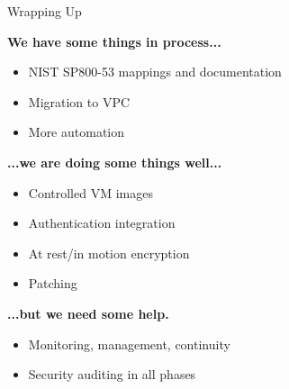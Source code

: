 \documentclass[t,handout]{beamer}   %
\begin{document}
\begin{frame}{Wrapping Up}

\textbf{We have some things in process...}
{\small
\begin{itemize}
\item NIST SP800-53 mappings and documentation
\item Migration to VPC
\item More automation
\end{itemize}
}

\textbf{...we are doing some things well...}
{\small
\begin{itemize}
\item Controlled VM images
\item Authentication integration
\item At rest/in motion encryption
\item Patching
\end{itemize}
}

\textbf{...but we need some help.}
{\small
\begin{itemize}
\item Monitoring, management, continuity
\item Security auditing in all phases
\end{itemize}
}

\end{frame}

\end{document}
